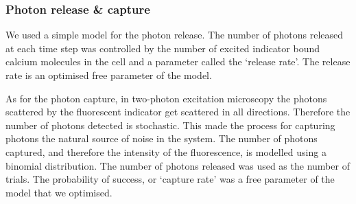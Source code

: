 \subsubsection{Photon release \& capture}
We used a simple model for the photon release. The number of photons released at each time step was controlled by the number of excited indicator bound calcium molecules in the cell and a parameter called the `release rate'. The release rate is an optimised free parameter of the model.

As for the photon capture, in two-photon excitation microscopy the photons scattered by the fluorescent indicator get scattered in all directions. Therefore the number of photons detected is stochastic. This made the process for capturing photons the natural source of noise in the system. The number of photons captured, and therefore the intensity of the fluorescence, is modelled using a binomial distribution. The number of photons released was used as the number of trials. The probability of success, or `capture rate' was a free parameter of the model that we optimised.

